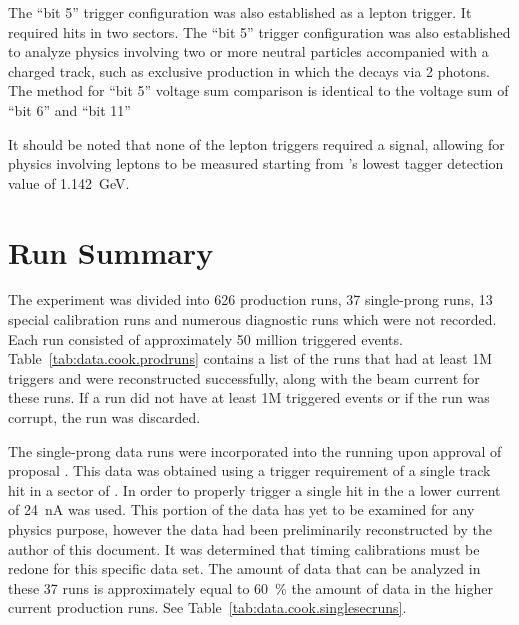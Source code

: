 The ``bit 5'' trigger configuration was also established as a lepton trigger. It required  hits in two sectors. The ``bit 5'' trigger configuration was also established to analyze physics involving two or more neutral particles accompanied with a charged track, such as exclusive \piz production in which the \piz decays via 2 photons. The method for ``bit 5'' voltage sum comparison is identical to the  voltage sum of ``bit 6'' and ``bit 11''

It should be noted that none of the lepton triggers required a  signal, allowing for physics involving leptons to be measured starting from 's lowest tagger detection value of 1.142~GeV.






\FloatBarrier

\section{ Run Summary}\label{sec:clas.g12.runs}

The  experiment was divided into 626 production runs, 37 single-prong runs, 13 special calibration runs and numerous diagnostic runs which were not recorded. Each run consisted of approximately 50 million triggered events. Table~\ref{tab:data.cook.prodruns} contains a list of the runs that had at least 1M triggers and were reconstructed successfully, along with the beam current for these runs. If a run did not have at least 1M triggered events or if the run was corrupt, the run was discarded.

%

The single-prong data runs were incorporated into the  running upon approval of proposal \cite{clas.proposal.pion}. This data was obtained using a trigger requirement of a single track hit in a sector of . In order to properly trigger a single hit in the  a lower current of 24~nA was used. This portion of the data has yet to be examined for any physics purpose, however the data had been preliminarily reconstructed by the author of this document. It was determined that timing calibrations must be redone for this specific data set. The amount of data that can be analyzed in these 37 runs is approximately equal to 60~\% the amount of data in the higher current production runs. See Table~\ref{tab:data.cook.singlesecruns}.

